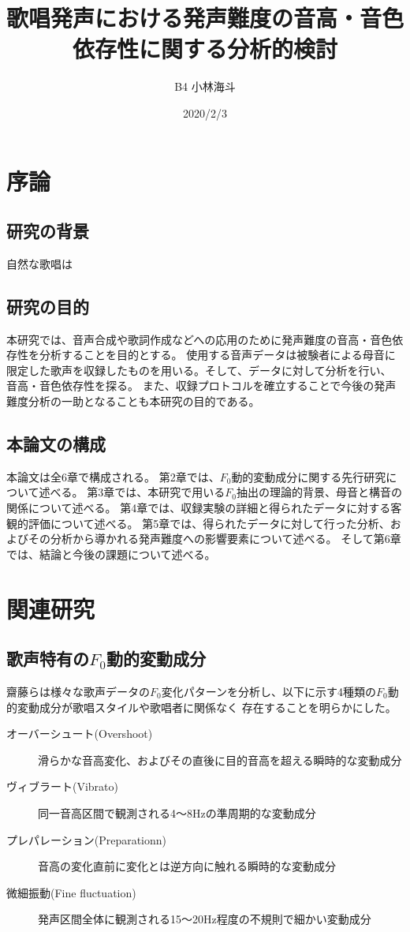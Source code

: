 \documentclass[10.5ptj,a4j,dvipdfmx,uplatex, oneside, openany]{jsbook}%
\title{歌唱発声における発声難度の音高・音色依存性に関する分析的検討}
\author{B4 小林海斗}
\date{2020/2/3}
\begin{document}

\tableofcontents

\chapter{序論}

\section{研究の背景}
自然な歌唱は


\section{研究の目的}
本研究では、音声合成や歌詞作成などへの応用のために発声難度の音高・音色依存性を分析することを目的とする。
使用する音声データは被験者による母音に限定した歌声を収録したものを用いる。そして、データに対して分析を行い、
音高・音色依存性を探る。
また、収録プロトコルを確立することで今後の発声難度分析の一助となることも本研究の目的である。

\section{本論文の構成}
本論文は全6章で構成される。
第2章では、$F_0$動的変動成分に関する先行研究について述べる。
第3章では、本研究で用いる$F_0$抽出の理論的背景、母音と構音の関係について述べる。
第4章では、収録実験の詳細と得られたデータに対する客観的評価について述べる。
第5章では、得られたデータに対して行った分析、およびその分析から導かれる発声難度への影響要素について述べる。
そして第6章では、結論と今後の課題について述べる。

\chapter{関連研究}

\section{歌声特有の$F_0$動的変動成分}
齋藤らは様々な歌声データの$F_0$変化パターンを分析し、以下に示す4種類の$F_0$動的変動成分が歌唱スタイルや歌唱者に関係なく
存在することを明らかにした。\cite{singbyspeaking}
\begin{description}
    \item[オーバーシュート(Overshoot)]滑らかな音高変化、およびその直後に目的音高を超える瞬時的な変動成分
    \item[ヴィブラート(Vibrato)]同一音高区間で観測される4〜8Hzの準周期的な変動成分
    \item[プレパレーション(Preparationn)]音高の変化直前に変化とは逆方向に触れる瞬時的な変動成分
    \item[微細振動(Fine fluctuation)] 発声区間全体に観測される15〜20Hz程度の不規則で細かい変動成分
\end{description}
\end{document}
